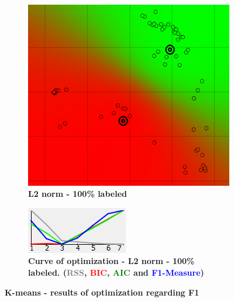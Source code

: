 \begin{figure}[!h]
\begin{subfigure}[h]{0.25\textwidth}
    \includegraphics[height=0.08\textheight]{./clustering/opt_F1_100__k_mean_L2_range7.png}
	\caption{\bf L2 norm - 100\% labeled}
    \label{fig:figure11b}
    \end{subfigure}
    \hspace{20mm}
    \begin{subfigure}[h]{0.50\textwidth}
    \centering
    \includegraphics[height=0.08\textheight]{./clustering/curve_opt_F1_100__k_mean_L2_range7.png}
	\caption{\bf Curve of optimization - L2 norm - 100\% labeled. (\textcolor{gray}{RSS}, \textcolor{red}{BIC}, \textcolor{green}{AIC} and \textcolor{blue}{F1-Measure})}
    \label{fig:figure11d}
    \end{subfigure}
\caption{\bf K-means - results of optimization regarding F1}
\label{fig:figure11}
\end{figure}


